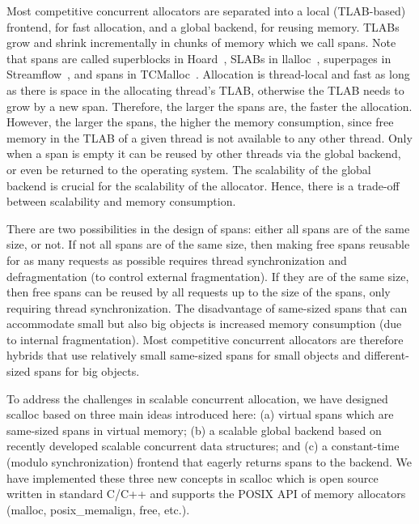 \documentclass[10pt]{sigplanconf}
\begin{document}
Most competitive concurrent allocators are separated into a local (TLAB-based) frontend, for fast allocation, and a global backend, for reusing memory. TLABs grow and shrink incrementally in chunks of memory which we call spans. Note that spans are called superblocks in Hoard~\cite{Berger:ASPLOS00}, SLABs in llalloc~\cite{llalloc}, superpages in Streamflow~\cite{Schneider:ISMM06}, and spans in TCMalloc~\cite{tcmalloc}. Allocation is thread-local and fast as long as there is space in the allocating thread's TLAB, otherwise the TLAB needs to grow by a new span. Therefore, the larger the spans are, the faster the allocation. However, the larger the spans, the higher the memory consumption, since free memory in the TLAB of a given thread is not available to any other thread. Only when a span is empty it can be reused by other threads via the global backend, or even be returned to the operating system. The scalability of the global backend is crucial for the scalability of the allocator. Hence, there is a trade-off between scalability and memory consumption.

There are two possibilities in the design of spans: either all spans are of the same size, or not. If not all spans are of the same size, then making free spans reusable for as many requests as possible requires thread synchronization and defragmentation (to control external fragmentation). If they are of the same size, then free spans can be reused by all requests up to the size of the spans, only requiring thread synchronization. The disadvantage of same-sized spans that can accommodate small but also big objects is increased memory consumption (due to internal fragmentation). Most competitive concurrent allocators are therefore hybrids that use relatively small same-sized spans for small objects and different-sized spans for big objects.

To address the challenges in scalable concurrent allocation, we have designed scalloc based on three main ideas introduced here: (a) virtual spans which are same-sized spans in virtual memory; (b) a scalable global backend based on recently developed scalable concurrent data structures; and (c) a constant-time (modulo synchronization) frontend that eagerly returns spans to the backend. We have implemented these three new concepts in scalloc which is open source written in standard C/C++ and supports the POSIX API of memory allocators (malloc, posix\_memalign, free, etc.).
\end{document}
